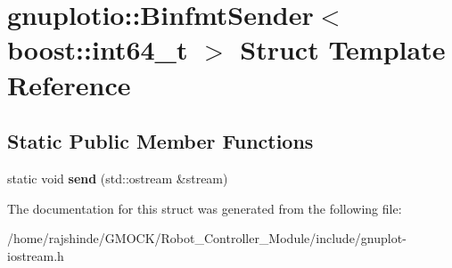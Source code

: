 \hypertarget{structgnuplotio_1_1_binfmt_sender_3_01boost_1_1int64__t_01_4}{}\section{gnuplotio\+:\+:Binfmt\+Sender$<$ boost\+:\+:int64\+\_\+t $>$ Struct Template Reference}
\label{structgnuplotio_1_1_binfmt_sender_3_01boost_1_1int64__t_01_4}
\subsection*{Static Public Member Functions}
\begin{DoxyCompactItemize}
\item 
static void {\bfseries send} (std\+::ostream \&stream)\hypertarget{structgnuplotio_1_1_binfmt_sender_3_01boost_1_1int64__t_01_4_a57423f02a4526e15d7d821606b1c8c81}{}\label{structgnuplotio_1_1_binfmt_sender_3_01boost_1_1int64__t_01_4_a57423f02a4526e15d7d821606b1c8c81}

\end{DoxyCompactItemize}


The documentation for this struct was generated from the following file\+:\begin{DoxyCompactItemize}
\item 
/home/rajshinde/\+G\+M\+O\+C\+K/\+Robot\+\_\+\+Controller\+\_\+\+Module/include/gnuplot-\/iostream.\+h\end{DoxyCompactItemize}
